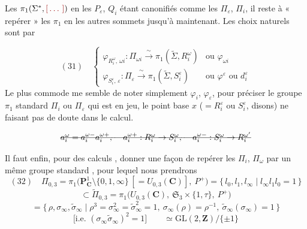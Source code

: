 \documentclass[11pt,a4paper]{article}
\begin{document}
Les $\pi_1(\Sigma^{*}, \text{\ill{}})$ en les $P_\varepsilon$, $Q_i$ étant canonifiés comme
les $\Pi_\varepsilon$, $\Pi_i$, il reste à « repérer » les $\pi_1$ en les autres sommets
 jusqu'à maintenant. Les choix naturels sont par
\struck{\ill{}}

\[
  (31)\quad
  \left\{
  \begin{array}{ll}
    \varphi_{R_i^{\omega},\, \omega i} : \Pi_{\omega i} \xrightarrow{\ \sim\ }
      \pi_1(\widetilde{\Sigma}, R_i^{\omega})
      & \text{ou } \varphi_{\omega i} \\[4pt]
    \varphi_{S_i^{\varepsilon},\, \varepsilon} : \Pi_\varepsilon \xrightarrow{\ \sim\ }
      \pi_1(\widetilde{\Sigma}, S_i^{\varepsilon})
      & \text{ou } \varphi^{\varepsilon} \text{ ou } d_i^{\varepsilon}
  \end{array}
  \right.
\]
Le plus commode me semble de noter simplement $\varphi_i$, $\varphi_\varepsilon$, pour
préciser le groupe $\pi_1$ standard $\Pi_i$ ou $\Pi_\varepsilon$ qui est en jeu, le point
base $x$ ($= R_i^{\varepsilon}$ ou $S_i^{\varepsilon}$, disons) ne faisant pas de doute
dans le calcul.

\[
  \text{\struck{$a_i^{\omega} = a_i^{\omega-} a_i^{\omega+}$, \quad $a_i^{\omega+} : R_i^{\omega} \to S_i^{\omega}$, \quad $a_i^{\omega-} : S_i^{\omega} \to R_i^{\omega'}$}}
\]

Il faut enfin, pour des calculs , donner une façon de repérer les
$\Pi_i$, $\Pi_\omega$ par un même groupe standard , pour lequel nous
prendrons
\[
  (32)\quad
  \Pi_{0,3} = \pi_1\big(\mathbf{P}^1_{\mathbf{C}} \setminus \{0,1,\infty\}
  \,[= U_{0,3}(\mathbf{C})],\ P^{+}\big)
  = \{\, l_0, l_1, l_\infty \mid l_\infty l_1 l_0 = 1 \,\}
\]
\[
  \subset \widetilde{\Pi}_{0,3}
  = \pi_1\big(U_{0,3}(\mathbf{C}),\ \mathfrak{S}_3 \times \{1,\tau\},\ P^{+}\big)
\]
\[
  = \{\, \rho, \sigma_\infty, \widetilde{\sigma}_\infty \mid
  \rho^3 = \sigma_\infty^2 = \widetilde{\sigma}_\infty^2 = 1,\
  \sigma_\infty(\rho) = \rho^{-1},\
  \widetilde{\sigma}_\infty(\sigma_\infty) = 1 \,\}
\]
\[
  \text{[i.e. } (\sigma_\infty \widetilde{\sigma}_\infty)^2 = 1 \text{]}
  \qquad \simeq \mathrm{GL}(2,\mathbf{Z})/\{\pm 1\}
\]
\end{document}
